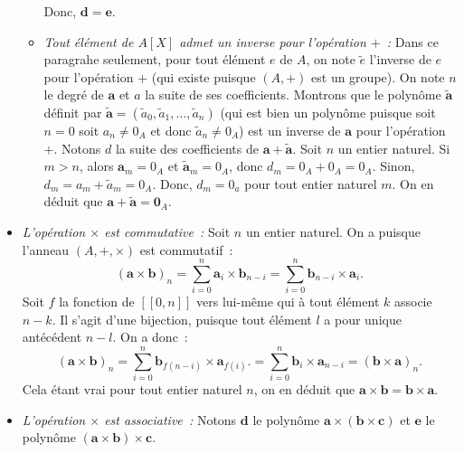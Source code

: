 \begin{itemize}[nosep]
\begin{itemize}[nosep]
                Donc, $\mathbf{d} = \mathbf{e}$.
            \item \textit{Tout élément de $A[X]$ admet un inverse pour l'opération $+$ :}
                Dans ce paragrahe seulement, pour tout élément $e$ de $A$, on note $\tilde{e}$ l'inverse de $e$ pour l'opération $+$ (qui existe puisque $(A, +)$ est un groupe). 
                On note $n$ le degré de $\mathbf{a}$ et $a$ la suite de ses coefficients. 
                Montrons que le polynôme $\tilde{\mathbf{a}}$ définit par $\tilde{\mathbf{a}} = (\tilde{a}_0, \tilde{a}_1, \dots, \tilde{a}_n)$ (qui est bien un polynôme puisque soit $n = 0$ soit $a_n \neq 0_A$ et donc $\tilde{a}_n \neq 0_A$) est un inverse de $\mathbf{a}$ pour l'opération $+$.
                Notons $d$ la suite des coefficients de $\mathbf{a} + \tilde{\mathbf{a}}$.
                Soit $n$ un entier naturel. 
                Si $m > n$, alors $\mathbf{a}_m = 0_A$ et $\tilde{\mathbf{a}}_m = 0_A$, donc $d_m = 0_A + 0_A = 0_A$.
                Sinon, $d_m = a_m + \tilde{a}_m = 0_A$.
                Donc, $d_m = 0_a$ pour tout entier naturel $m$.
                On en déduit que $\mathbf{a} + \tilde{\mathbf{a}} = \mathbf{0}_A$.
        \end{itemize}
    \item \textit{L'opération $\times$ est commutative :}
        Soit $n$ un entier naturel.
        On a puisque l'anneau $(A, +, \times)$ est commutatif : 
        \begin{equation*}
            (\mathbf{a} \times \mathbf{b})_n
            = \sum_{i=0}^n \mathbf{a}_i \times \mathbf{b}_{n-i}
            = \sum_{i=0}^n \mathbf{b}_{n-i} \times \mathbf{a}_i. 
        \end{equation*}
        Soit $f$ la fonction de $[\![0, n]\!]$ vers lui-même qui à tout élément $k$ associe $n-k$. 
        Il s'agit d'une bijection, puisque tout élément $l$ a pour unique antécédent $n-l$. 
        On a donc :
        \begin{equation*}
            (\mathbf{a} \times \mathbf{b})_n
            = \sum_{i=0}^n \mathbf{b}_{f(n-i)} \times \mathbf{a}_{f(i)}. 
            = \sum_{i=0}^n \mathbf{b}_{i} \times \mathbf{a}_{n-i}
            = (\mathbf{b} \times \mathbf{a})_n .
        \end{equation*}
        Cela étant vrai pour tout entier naturel $n$, on en déduit que $\mathbf{a} \times \mathbf{b} = \mathbf{b} \times \mathbf{a}$.
    \item \textit{L'opération $\times$ est associative :}
        Notons $\mathbf{d}$ le polynôme $\mathbf{a} \times (\mathbf{b} \times \mathbf{c})$ et $\mathbf{e}$ le polynôme $(\mathbf{a} \times \mathbf{b}) \times \mathbf{c}$. 

\end{itemize}
